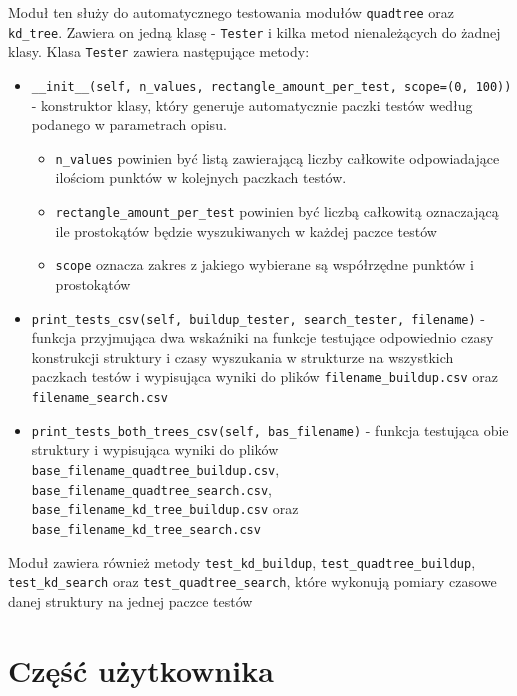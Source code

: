\documentclass{article}
\begin{document}
Moduł ten służy do automatycznego testowania modułów \texttt{quadtree} oraz \texttt{kd\_tree}. Zawiera on jedną klasę - \texttt{Tester} i kilka metod nienależących do żadnej klasy. Klasa \texttt{Tester} zawiera następujące metody:
\begin{itemize}
    
    \item \texttt{\_\_init\_\_(self, n\_values, rectangle\_amount\_per\_test, scope=(0, 100))} - konstruktor klasy, który generuje automatycznie paczki testów według podanego w parametrach opisu.
    \begin{itemize}
        \item \texttt{n\_values} powinien być listą zawierającą liczby całkowite odpowiadające ilościom punktów w kolejnych paczkach testów.
        
        \item \texttt{rectangle\_amount\_per\_test} powinien być liczbą całkowitą oznaczającą ile prostokątów będzie wyszukiwanych w każdej paczce testów
        
        \item \texttt{scope} oznacza zakres z jakiego wybierane są współrzędne punktów i prostokątów
        
    \end{itemize}
    
    \item \texttt{print\_tests\_csv(self, buildup\_tester, search\_tester, filename)} - funkcja przyjmująca dwa wskaźniki na funkcje testujące odpowiednio czasy konstrukcji struktury i czasy wyszukania w strukturze na wszystkich paczkach testów i wypisująca wyniki do plików \texttt{filename\_buildup.csv} oraz \texttt{filename\_search.csv}
    
    \item \texttt{print\_tests\_both\_trees\_csv(self, bas\_filename)} - funkcja testująca obie struktury i wypisująca wyniki do plików \texttt{base\_filename\_quadtree\_buildup.csv}, \texttt{base\_filename\_quadtree\_search.csv}, \texttt{base\_filename\_kd\_tree\_buildup.csv} oraz \texttt{base\_filename\_kd\_tree\_search.csv}
    
\end{itemize}

Moduł zawiera również metody \texttt{test\_kd\_buildup}, \texttt{test\_quadtree\_buildup}, \texttt{test\_kd\_search} oraz \texttt{test\_quadtree\_search}, które wykonują pomiary czasowe danej struktury na jednej paczce testów

\section{Część użytkownika}
\end{document}
